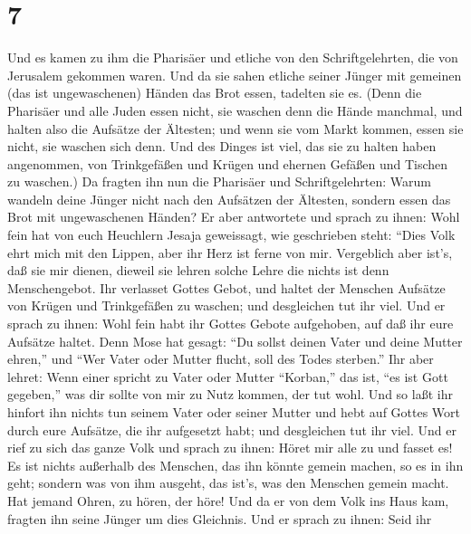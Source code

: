 \hypertarget{section-6}{%
\section{7}\label{section-6}}

 Und es kamen zu ihm die Pharisäer und etliche von den
Schriftgelehrten, die von Jerusalem gekommen waren.  Und da
sie sahen etliche seiner Jünger mit gemeinen (das ist ungewaschenen)
Händen das Brot essen, tadelten sie es.  (Denn die Pharisäer
und alle Juden essen nicht, sie waschen denn die Hände manchmal, und
halten also die Aufsätze der Ältesten;  und wenn sie vom
Markt kommen, essen sie nicht, sie waschen sich denn. Und des Dinges ist
viel, das sie zu halten haben angenommen, von Trinkgefäßen und Krügen
und ehernen Gefäßen und Tischen zu waschen.)  Da fragten ihn
nun die Pharisäer und Schriftgelehrten: Warum wandeln deine Jünger nicht
nach den Aufsätzen der Ältesten, sondern essen das Brot mit
ungewaschenen Händen?  Er aber antwortete und sprach zu
ihnen: Wohl fein hat von euch Heuchlern Jesaja geweissagt, wie
geschrieben steht: ``Dies Volk ehrt mich mit den Lippen, aber ihr Herz
ist ferne von mir.  Vergeblich aber ist's, daß sie mir
dienen, dieweil sie lehren solche Lehre die nichts ist denn
Menschengebot.  Ihr verlasset Gottes Gebot, und haltet der
Menschen Aufsätze von Krügen und Trinkgefäßen zu waschen; und
desgleichen tut ihr viel.  Und er sprach zu ihnen: Wohl fein
habt ihr Gottes Gebote aufgehoben, auf daß ihr eure Aufsätze haltet.
 Denn Mose hat gesagt: ``Du sollst deinen Vater und deine
Mutter ehren,'' und ``Wer Vater oder Mutter flucht, soll des Todes
sterben.''  Ihr aber lehret: Wenn einer spricht zu Vater
oder Mutter ``Korban,'' das ist, ``es ist Gott gegeben,'' was dir sollte
von mir zu Nutz kommen, der tut wohl.  Und so laßt ihr
hinfort ihn nichts tun seinem Vater oder seiner Mutter  und
hebt auf Gottes Wort durch eure Aufsätze, die ihr aufgesetzt habt; und
desgleichen tut ihr viel.  Und er rief zu sich das ganze
Volk und sprach zu ihnen: Höret mir alle zu und fasset es! 
Es ist nichts außerhalb des Menschen, das ihn könnte gemein machen, so
es in ihn geht; sondern was von ihm ausgeht, das ist's, was den Menschen
gemein macht.  Hat jemand Ohren, zu hören, der höre!
 Und da er von dem Volk ins Haus kam, fragten ihn seine
Jünger um dies Gleichnis.  Und er sprach zu ihnen: Seid ihr
